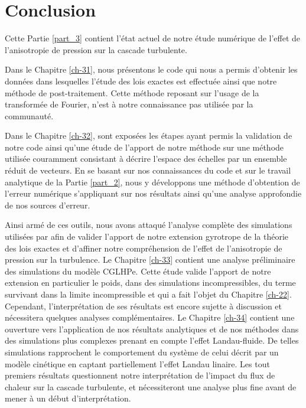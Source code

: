 \chapter*{Conclusion}
 \adjustmtc
\renewcommand\partie{\Partie\ CONCLUSION}
\label{ch-35}

\bigskip
\minitoc  

Cette Partie \ref{part_3} contient l'état actuel de notre étude numérique de l'effet de l'anisotropie de pression sur la cascade turbulente. 

Dans le Chapitre \ref{ch-31}, nous présentons le code qui nous a permis d'obtenir les données dans lesquelles l'étude des lois exactes est effectuée ainsi que notre méthode de post-traitement. Cette méthode reposant sur l'usage de la transformée de Fourier, n'est à notre connaissance pas utilisée par la communauté. 

Dans le Chapitre \ref{ch-32}, sont exposées les étapes ayant permis la validation de notre code ainsi qu'une étude de l'apport de notre méthode sur une méthode utilisée couramment consistant à décrire l'espace des échelles par un ensemble réduit de vecteurs. En se basant sur nos connaissances du code et sur le travail analytique de la Partie \ref{part_2}, nous y développons une méthode d'obtention de l'erreur numérique s'appliquant sur nos résultats ainsi qu'une analyse approfondie de nos sources d'erreur. 

Ainsi armé de ces outils, nous avons attaqué l'analyse complète des simulations utilisées par \cite{ferrand_fluid_2021} afin de valider l'apport de notre extension gyrotrope de la théorie des lois exactes et d'affiner notre compréhension de l'effet de l'anisotropie de pression sur la turbulence. Le Chapitre \ref{ch-33} contient une analyse préliminaire des simulations du modèle \acs{CGLHPe}. Cette étude valide l'apport de notre extension en particulier le poids, dans des simulations incompressibles, du terme survivant dans la limite incompressible et qui a fait l'objet du Chapitre \ref{ch-22}. Cependant, l'interprétation de ses résultats est encore sujette à discussion et nécessitera quelques analyses complémentaires. Le Chapitre \ref{ch-34} contient une ouverture vers l'application de nos résultats analytiques et de nos méthodes dans des simulations plus complexes prenant en compte l'effet Landau-fluide. De telles simulations rapprochent le comportement du système de celui décrit par un modèle cinétique en captant partiellement l'effet Landau linaire. Les tout premiers résultats questionnent notre interprétation de l'impact du flux de chaleur sur la cascade turbulente, et nécessiteront une analyse plus fine avant de mener à un début d'interprétation. 




